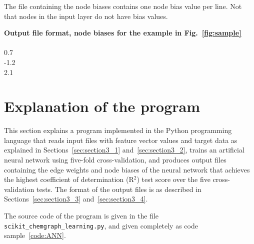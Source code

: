\documentclass[11pt,titlepage,dvipdfmx,twoside]{article}
\begin{document}
\bigskip

The file containing the node biases contains one node bias value per line.
Not that nodes in the input layer do not have bias values.

\bigskip

\begin{oframed}
{\bf Output file format, node biases for the example in Fig.~\ref{fig:sample}}\\\\
0.7\\
-1.2\\
2.1\\
\end{oframed}

\bigskip

\newpage

\section{Explanation of the program}
\label{sec:section4}

This section explains a program implemented
in the Python programming language that
reads input files with feature vector values and target data
as explained in Sections~\ref{sec:section3_1} and~\ref{sec:section3_2},
trains an artificial neural network using five-fold cross-validation,
and produces output files containing the edge weights and node biases of
the neural network that achieves the highest coefficient of determination (R$^2$)
test score over the five cross-validation tests.
The format of the output files is as described in Sections~\ref{sec:section3_3} and~\ref{sec:section3_4}.

The source code of the program is given in the file {\tt scikit\_chemgraph\_learning.py},
and given completely as code sample~\ref{code:ANN}.

\bigskip\bigskip
\end{document}
